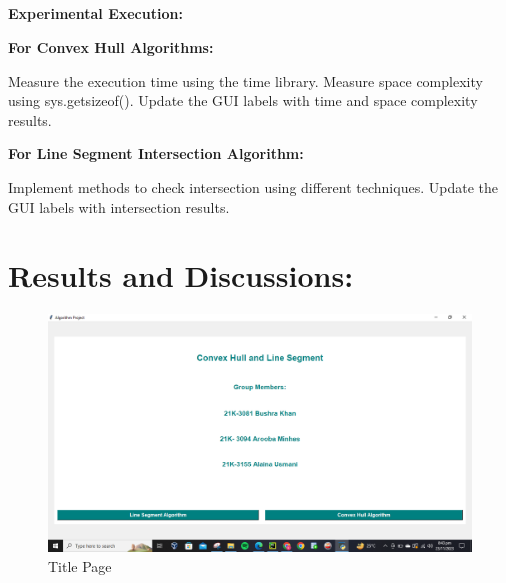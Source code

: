 \subsection{}
\textbf{Experimental Execution:}

\textbf{For Convex Hull Algorithms:}

Measure the execution time using the time library.
Measure space complexity using sys.getsizeof().
Update the GUI labels with time and space complexity results.

\textbf{For Line Segment Intersection Algorithm:}

Implement methods to check intersection using different techniques.
Update the GUI labels with intersection results.

\section{\textbf{Results and Discussions:}}

\begin{figure}
    \centering
    \includegraphics[width=1\linewidth]{p1.PNG}
    \caption{Title Page}
    \label{fig:enter-label}
\end{figure}

